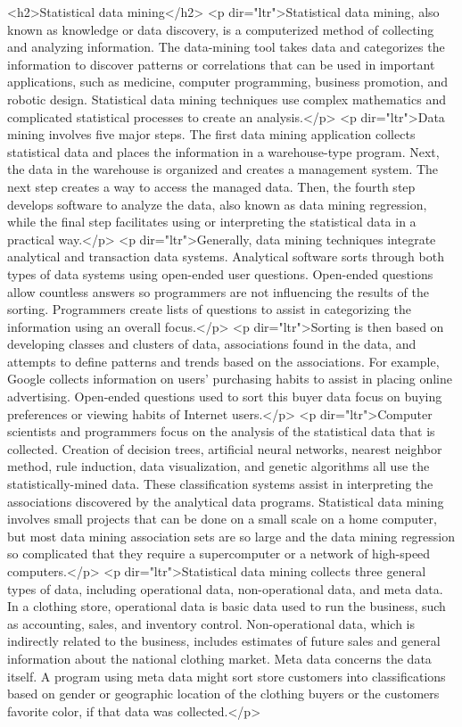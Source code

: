 <h2>Statistical data mining</h2>
<p dir="ltr">Statistical data mining, also known as knowledge or data discovery, is a computerized method of collecting and analyzing information. The data-mining tool takes data and categorizes the information to discover patterns or correlations that can be used in important applications, such as medicine, computer programming, business promotion, and robotic design. Statistical data mining techniques use complex mathematics and complicated statistical processes to create an analysis.</p>
<p dir="ltr">Data mining involves five major steps. The first data mining application collects statistical data and places the information in a warehouse-type program. Next, the data in the warehouse is organized and creates a management system. The next step creates a way to access the managed data. Then, the fourth step develops software to analyze the data, also known as data mining regression, while the final step facilitates using or interpreting the statistical data in a practical way.</p>
<p dir="ltr">Generally, data mining techniques integrate analytical and transaction data systems. Analytical software sorts through both types of data systems using open-ended user questions. Open-ended questions allow countless answers so programmers are not influencing the results of the sorting. Programmers create lists of questions to assist in categorizing the information using an overall focus.</p>
<p dir="ltr">Sorting is then based on developing classes and clusters of data, associations found in the data, and attempts to define patterns and trends based on the associations. For example, Google collects information on users’ purchasing habits to assist in placing online advertising. Open-ended questions used to sort this buyer data focus on buying preferences or viewing habits of Internet users.</p>
<p dir="ltr">Computer scientists and programmers focus on the analysis of the statistical data that is collected. Creation of decision trees, artificial neural networks, nearest neighbor method, rule induction, data visualization, and genetic algorithms all use the statistically-mined data. These classification systems assist in interpreting the associations discovered by the analytical data programs. Statistical data mining involves small projects that can be done on a small scale on a home computer, but most data mining association sets are so large and the data mining regression so complicated that they require a supercomputer or a network of high-speed computers.</p>
<p dir="ltr">Statistical data mining collects three general types of data, including operational data, non-operational data, and meta data. In a clothing store, operational data is basic data used to run the business, such as accounting, sales, and inventory control. Non-operational data, which is indirectly related to the business, includes estimates of future sales and general information about the national clothing market. Meta data concerns the data itself. A program using meta data might sort store customers into classifications based on gender or geographic location of the clothing buyers or the customers favorite color, if that data was collected.</p>
